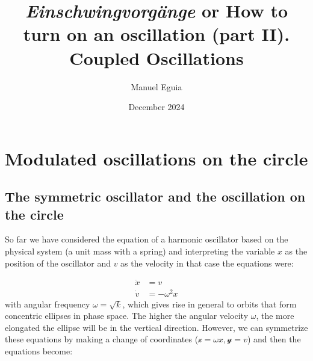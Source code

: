 \documentclass{article}
\title{{\em Einschwingvorgänge} or How to turn on an oscillation (part II). \\ Coupled Oscillations}
\author{Manuel Eguia}
\date{December 2024}
\begin{document}
\maketitle

\section{Modulated oscillations on the circle}

\subsection{The symmetric oscillator and the oscillation on the circle}
So far we have considered the equation of a harmonic oscillator based on the physical system (a unit mass with a spring) and interpreting the variable $x$ as the position of the oscillator and $v$ as the velocity in that case the equations were:

\begin{subequations} \label{eq_harmosc}
\begin{align}
    \dot{x} & = v \\
    \dot{v} & = -\omega^2x 
\end{align}
\end{subequations}
with angular frequency $\omega=\sqrt{k}$, which gives rise in general to orbits that form concentric ellipses in phase space. The higher the angular velocity $\omega$, the more elongated the ellipse will be in the vertical direction. 
However, we can symmetrize these equations by making a change of coordinates ($\mathscr{x} = \omega x , \mathscr{y} = v$) and then the equations become:
\end{document}
